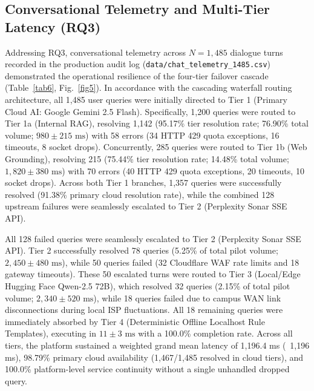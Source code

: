 \documentclass[conference]{IEEEtran}
\begin{document}
\subsection{Conversational Telemetry and Multi-Tier Latency (RQ3)}
Addressing RQ3, conversational telemetry across $N = 1,485$ dialogue turns recorded in the production audit log (\texttt{data/chat\_telemetry\_1485.csv}) demonstrated the operational resilience of the four-tier failover cascade (Table~\ref{tab6}, Fig.~\ref{fig5}). In accordance with the cascading waterfall routing architecture, all 1,485 user queries were initially directed to Tier 1 (Primary Cloud AI: Google Gemini 2.5 Flash). Specifically, 1,200 queries were routed to Tier 1a (Internal RAG), resolving 1,142 (95.17\% tier resolution rate; 76.90\% total volume; $980 \pm 215\text{ ms}$) with 58 errors (34 HTTP 429 quota exceptions, 16 timeouts, 8 socket drops). Concurrently, 285 queries were routed to Tier 1b (Web Grounding), resolving 215 (75.44\% tier resolution rate; 14.48\% total volume; $1,820 \pm 380\text{ ms}$) with 70 errors (40 HTTP 429 quota exceptions, 20 timeouts, 10 socket drops). Across both Tier 1 branches, 1,357 queries were successfully resolved (91.38\% primary cloud resolution rate), while the combined 128 upstream failures were seamlessly escalated to Tier 2 (Perplexity Sonar SSE API).

All 128 failed queries were seamlessly escalated to Tier 2 (Perplexity Sonar SSE API). Tier 2 successfully resolved 78 queries (5.25\% of total pilot volume; $2,450 \pm 480\text{ ms}$), while 50 queries failed (32 Cloudflare WAF rate limits and 18 gateway timeouts). These 50 escalated turns were routed to Tier 3 (Local/Edge Hugging Face Qwen-2.5 72B), which resolved 32 queries (2.15\% of total pilot volume; $2,340 \pm 520\text{ ms}$), while 18 queries failed due to campus WAN link disconnections during local ISP fluctuations. All 18 remaining queries were immediately absorbed by Tier 4 (Deterministic Offline Localhost Rule Templates), executing in $11 \pm 3\text{ ms}$ with a 100.0\% completion rate. Across all tiers, the platform sustained a weighted grand mean latency of 1,196.4 ms (~1,196 ms), 98.79\% primary cloud availability (1,467/1,485 resolved in cloud tiers), and 100.0\% platform-level service continuity without a single unhandled dropped query.
\end{document}

